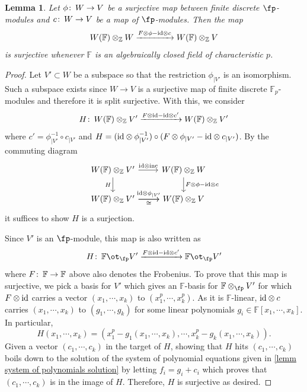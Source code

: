 \documentclass[english,10pt]{amsart}
\newcommand{\field}{\mathbb{F}}
\newtheorem{lemm}{Lemma}[section]
\theoremstyle{definition}
\numberwithin{equation}{section}
\def\co{\colon\thinspace}
\begin{document}
\begin{lemm}\label{lemm H mod p is surjective in fp closure}
Let  $\phi\co W \to V$ be a surjective map between finite discrete $\fp$-modules and $c\co W\to V$ be a map of $\fp$-modules. Then the map 
\[W(\field) \otimes_{\mathbb{Z}} W \xrightarrow{F \otimes \phi - \textup{id} \otimes c} W(\field) \otimes_{\mathbb{Z}}  V\]
is surjective whenever $\field$ is an algebraically closed field of characteristic $p$. 
\end{lemm}

\begin{proof}
Let $V'\subset W$ be a subspace  so that the restriction $\phi_{\mid V'}$ is an isomorphism. Such a subspace exists since $W\to V$ is a surjective map of finite discrete $\mathbb{F}_p$-modules and therefore it is split surjective. 
With this, we consider
\[H \co W(\field) \otimes_{\mathbb{Z}} V' \xrightarrow{F \otimes \textup{id} - \textup{id} \otimes c'}W(\field)  \otimes_{\mathbb{Z}} V'\]
where $c'=\phi_{|{V'}}^{-1}\circ c_{|{V'}}$ and $H=(\textup{id}\otimes \phi_{|V'}^{-1})\circ (F\otimes\phi_{|{V'}}-\textup{id}\otimes c_{|{V'}})$. By the commuting diagram 
\[
\begin{tikzcd}
W(\field) \otimes_{\mathbb{Z}} V' \ar[r,"\textup{id}\otimes \textup{inc}"] \ar[d,"H",swap] & W(\field) \otimes_{\mathbb{Z}} W \ar[d,"F\otimes \phi -\textup{id}\otimes c"] \\ 
W(\field) \otimes_{\mathbb{Z}} V'\ar[r,"\textup{id}\otimes \phi_{|{V'}}"]\ar[r,swap,"\cong"] &  W(\field) \otimes_{\mathbb{Z}} V 
\end{tikzcd}
\]
it suffices to show $H$ is a surjection. 

Since $V'$ is an $\fp$-module, this map is also written as 
\[H \co \field \ot_{\fp} V' \xrightarrow{F \otimes \textup{id} - \textup{id} \otimes c'}\field \ot_{\fp} V'\]
where $F\co \field \to \field$ above also denotes the Frobenius. To prove that this map is surjective, we pick a basis for $V'$ which gives an $\field$-basis for $\field\otimes_{\fp} V'$ for which $F \otimes \textup{id}$ carries a vector $(x_1,\cdots,x_k)$ to $(x_1^p,\cdots,x_k^p)$. As it is $\field$-linear, $\textup{id}\otimes c$ carries $(x_1,\cdots,x_k)$ to $(g_1,\cdots,g_k)$ for some linear polynomials $g_i \in \field[x_1,\cdots,x_k]$. In particular, 
\[H(x_1,\cdots,x_k) = (x_1^p-g_1(x_1,\cdots,x_k),\cdots,x_k^p-g_k(x_1,\cdots,x_k)).\]
Given a vector $(c_1,\cdots,c_k)$ in the target of $H$, showing that $H$ hits $(c_1,\cdots,c_k)$ boils down to the solution of the system of polynomial equations given in \autoref{lemm system of polynomials solution} by letting $f_i = g_i+c_i$ which proves that $(c_1,\cdots,c_k)$ is in the image of $H$. Therefore, $H$ is surjective as desired.
\end{proof}
\end{document}
